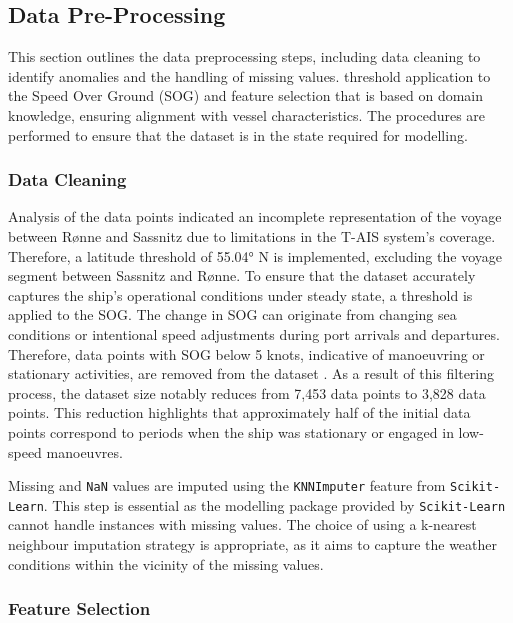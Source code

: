 \documentclass[]{interact}
\theoremstyle{plain}%
\theoremstyle{definition}
\theoremstyle{remark}
\begin{document}
\subsection{Data Pre-Processing}\label{sec:data_prep}

This section outlines the data preprocessing steps, including data cleaning to identify anomalies and the handling of missing values. threshold application to the Speed Over Ground (SOG) and feature selection that is based on domain knowledge, ensuring alignment with vessel characteristics. The procedures are performed to ensure that the dataset is in the state required for modelling. 

\subsubsection{Data Cleaning}\label{sec:data_cleaning}

Analysis of the data points indicated an incomplete representation of the voyage between R{\o}nne and Sassnitz due to limitations in the T-AIS system's coverage. Therefore, a latitude threshold of 55.04° N is implemented, excluding the voyage segment between Sassnitz and R{\o}nne. To ensure that the dataset accurately captures the ship's operational conditions under steady state, a threshold is applied to the SOG. The change in SOG can originate from changing sea conditions or intentional speed adjustments during port arrivals and departures. Therefore, data points with SOG below 5 knots, indicative of manoeuvring or stationary activities, are removed from the dataset \citep{Abebe.2020, Yan.2020}. As a result of this filtering process, the dataset size notably reduces from 7,453 data points to 3,828 data points. This reduction highlights that approximately half of the initial data points correspond to periods when the ship was stationary or engaged in low-speed manoeuvres.

Missing and \texttt{NaN} values are imputed using the \texttt{KNNImputer} feature from \texttt{Scikit-Learn}. This step is essential as the modelling package provided by \texttt{Scikit-Learn} cannot handle instances with missing values. The choice of using a k-nearest neighbour imputation strategy is appropriate, as it aims to capture the weather conditions within the vicinity of the missing values.

\subsubsection{Feature Selection}\label{sec:feature_select}
\end{document}
